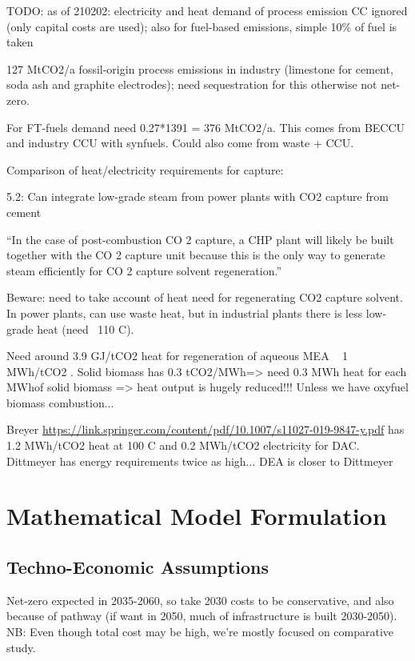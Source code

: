TODO: as of 210202: electricity and heat demand of process emission CC ignored
(only capital costs are used); also for fuel-based emissions, simple 10\% of
fuel is taken

127 MtCO2/a fossil-origin process emissions in industry (limestone for cement,
soda ash and graphite electrodes); need sequestration for this otherwise not
net-zero.

For FT-fuels demand need 0.27*1391 = 376 MtCO2/a. This comes from BECCU and
industry CCU with synfuels. Could also come from waste + CCU.


Comparison of heat/electricity requirements for capture:

 5.2: Can integrate low-grade steam from power plants with
CO2 capture from cement

``In the case of post-combustion CO 2 capture, a CHP plant will likely be built
together with the CO 2 capture unit because this is the only way to generate
steam efficiently for CO 2 capture solvent regeneration.''

Beware: need to take account of heat need for regenerating CO2 capture solvent.
In power plants, can use waste heat, but in industrial plants there is less
low-grade heat (need ~110 C). 

Need around 3.9 GJ/tCO2 heat for regeneration of aqueous MEA ~ 1 MWh/tCO2
. Solid biomass has 0.3 tCO2/MWh\th => need 0.3 MWh heat for
each MWh\th of solid biomass => heat output is hugely reduced!!! Unless we have
oxyfuel biomass combustion...

Breyer \url{https://link.springer.com/content/pdf/10.1007/s11027-019-9847-y.pdf}
has 1.2 MWh/tCO2 heat at 100 C and 0.2 MWh\el/tCO2 electricity for DAC.
Dittmeyer has energy requirements twice as high... DEA is closer to Dittmeyer



\section{Mathematical Model Formulation}

\begin{landscape}



\section{Techno-Economic Assumptions}

Net-zero expected in 2035-2060, so take 2030 costs to be conservative, and also because of pathway (if want in 2050, much of infrastructure is built 2030-2050). NB: Even though total cost may be high, we're mostly focused on comparative study.

\begin{small}

\end{small}

\end{landscape}

\restoregeometry